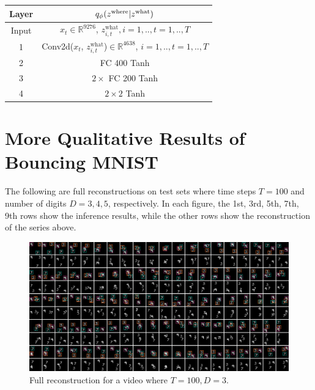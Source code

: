 \documentclass{article}
\theoremstyle{definition}
\begin{document}
\begin{table}[h!]
    \centering
    \begin{tabular}{c|c}
     \toprule
    \textbf{Layer} & $q_\phi(z^{\mathrm{where}} | z^{\mathrm{what}})$ \\
    \midrule
    Input &
    $x_t\in\mathbb{R}^{9276}$, $z^{\mathrm{what}}_{i, t}, i=1,.., t=1,..,T$ \\
    \hline
    1 & 
    Conv2d($x_t$, $z^{\mathrm{what}}_{i, t}$)$\in\mathbb{R}^{4638}$, $i=1,.., t=1,..,T$ \\
    \hline
    2  &
    FC 400 Tanh \\
    \hline
    3 & $2\times$ FC 200 Tanh \\
    \hline
    4 &
    $2\times2$ Tanh 
    \\
    \bottomrule
    \end{tabular}
    \label{arch-bmnist-enc-where}
\end{table}
\newpage
\section{More Qualitative Results of Bouncing MNIST}
\label{appendix:full-recons}
The following are full reconstructions on test sets where time steps $T=100$ and number of digits $D=3, 4, 5$, respectively. In each figure, the 1st, 3rd, 5th, 7th, 9th rows show the inference results, while the other rows show the reconstruction of the series above.
\begin{figure}[h!]
\includegraphics[width=170mm]{figures/T=100-D=3.pdf}
\caption{Full reconstruction for a video where $T=100, D=3$.}
\end{figure}
\end{document}

